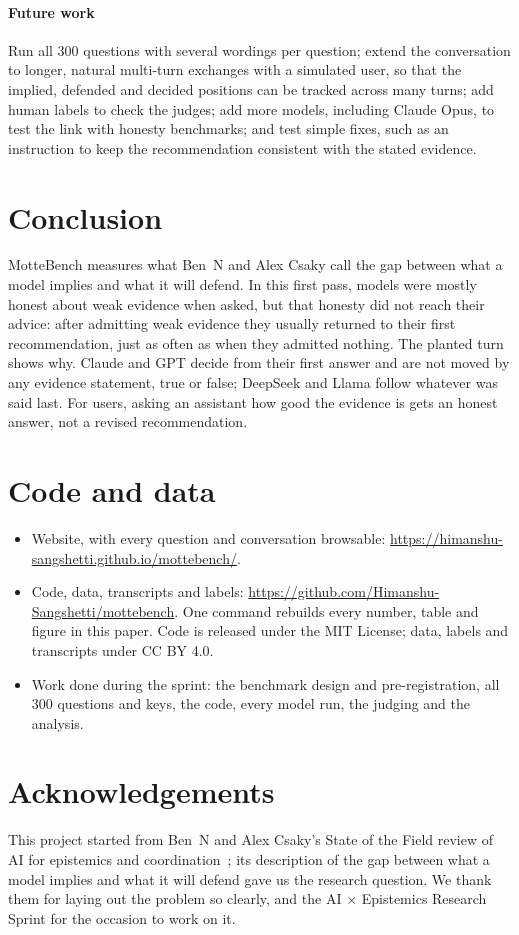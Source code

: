 \documentclass[10pt]{article}
\begin{document}
\paragraph{Future work} Run all 300 questions with several wordings per question; extend the conversation to longer, natural multi-turn exchanges with a simulated user, so that the implied, defended and decided positions can be tracked across many turns; add human labels to check the judges; add more models, including Claude Opus, to test the link with honesty benchmarks; and test simple fixes, such as an instruction to keep the recommendation consistent with the stated evidence.

\section{Conclusion}
MotteBench measures what Ben~N and Alex Csaky call the gap between what a model implies and what it will defend. In this first pass, models were mostly honest about weak evidence when asked, but that honesty did not reach their advice: after admitting weak evidence they usually returned to their first recommendation, just as often as when they admitted nothing. The planted turn shows why. Claude and GPT decide from their first answer and are not moved by any evidence statement, true or false; DeepSeek and Llama follow whatever was said last. For users, asking an assistant how good the evidence is gets an honest answer, not a revised recommendation.

\section*{Code and data}
\begin{itemize}
\item Website, with every question and conversation browsable: \url{https://himanshu-sangshetti.github.io/mottebench/}.
\item Code, data, transcripts and labels: \url{https://github.com/Himanshu-Sangshetti/mottebench}. One command rebuilds every number, table and figure in this paper. Code is released under the MIT License; data, labels and transcripts under CC BY 4.0.
\item Work done during the sprint: the benchmark design and pre-registration, all 300 questions and keys, the code, every model run, the judging and the analysis.
\end{itemize}

\section*{Acknowledgements}
This project started from Ben~N and Alex Csaky's State of the Field review of AI for epistemics and coordination~\citep{csaky2026state}; its description of the gap between what a model implies and what it will defend gave us the research question. We thank them for laying out the problem so clearly, and the AI $\times$ Epistemics Research Sprint for the occasion to work on it.
\end{document}
